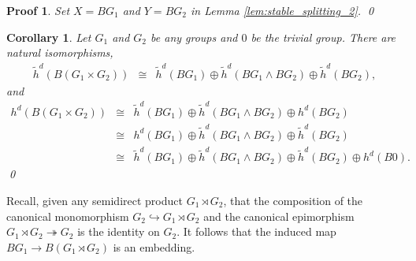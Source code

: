 \documentclass[sort&compress]{elsarticle}
\theoremstyle{theoremstyle}
\newtheorem{cor}[nul]{Corollary}
\theoremstyle{framedtheoremstyle}
\theoremstyle{definitionstyle}
\theoremstyle{definitionstyle}
\theoremstyle{definitionstyle}
\theoremstyle{definitionstyle}
\theoremstyle{nameddefinitionstyle}
\theoremstyle{framednameddefinitionstyle}
\theoremstyle{proofstyle}
\newtheorem{pf}{Proof}
\theoremstyle{definitionstyle}
\newcommand{\fromto}{\rightarrow}
\newcommand{\oneone}{\hookrightarrow}
\newcommand{\onto}{\twoheadrightarrow}
\newcommand{\isomorphic}{\cong}
\newcommand{\paren}[1]{\left( #1 \right)}
\begin{document}
\begin{appendices}
\begin{pf}%
Set $X = BG_1$ and $Y=BG_2$ in Lemma \ref{lem:stable_splitting_2}.
\qed\end{pf}


\begin{cor}\label{cor:generalization_arbitrary_product}
Let $G_1$ and $G_2$ be any groups and $0$ be the trivial group. There are natural isomorphisms,
\begin{eqnarray}
\tilde h^d\paren{B\paren{G_1\times G_2}} &\isomorphic& \tilde h^d\paren{BG_1} \oplus \tilde h^d\paren{BG_1 \wedge BG_2} \oplus \tilde h^d\paren{BG_2},
\end{eqnarray}
and
\begin{eqnarray}
h^d\paren{B\paren{G_1 \times G_2}} &\isomorphic& \tilde h^d\paren{BG_1} \oplus \tilde h^d\paren{BG_1 \wedge BG_2} \oplus h^d\paren{BG_2} \\
&\isomorphic& h^d\paren{BG_1} \oplus \tilde h^d\paren{BG_1 \wedge BG_2} \oplus \tilde h^d\paren{BG_2} \\
&\isomorphic& \tilde h^d\paren{BG_1} \oplus \tilde h^d\paren{BG_1 \wedge BG_2} \oplus \tilde h^d\paren{BG_2} \oplus h^d\paren{B0}.
\end{eqnarray}\qed
\end{cor}






Recall, given any semidirect product $G_1 \rtimes G_2$, that the composition of the canonical monomorphism $G_2 \oneone G_1 \rtimes G_2$ and the canonical epimorphism $G_1 \rtimes G_2 \onto G_2$ is the identity on $G_2$. It follows that the induced map $BG_1 \fromto B\paren{G_1 \rtimes G_2}$ is an embedding.


\end{appendices}
\end{document}
